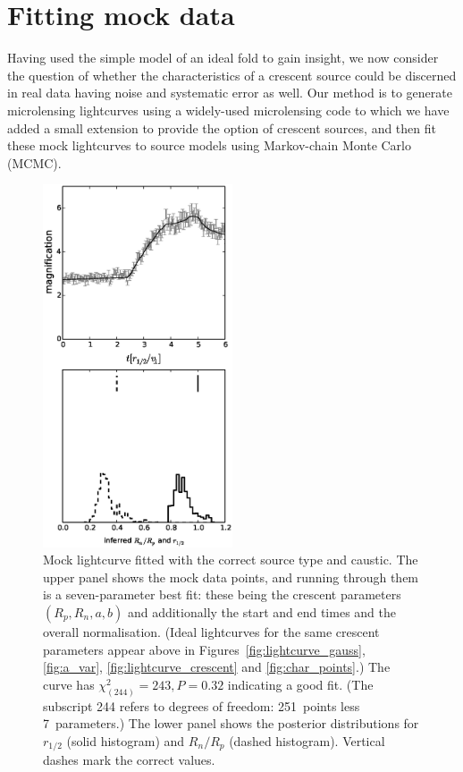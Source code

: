 \documentclass[usenatbib]{mn2e}
\begin{document}
\section{Fitting mock data}\label{sec:numerics}

Having used the simple model of an ideal fold to gain insight, we now
consider the question of whether the characteristics of a crescent
source could be discerned in real data having noise and systematic
error as well.  Our method is to generate microlensing lightcurves
using a widely-used microlensing code
\citep{1990PhDT.......180W,1999A&A...346L...5W,1999JCoAM.109..353W} to
which we have added a small extension to provide the option of
crescent sources, and then fit these mock lightcurves to source models
using Markov-chain Monte Carlo (MCMC).

\begin{figure}
\centering
  \includegraphics[width=0.5\textwidth]{figures/cc_forward.eps}
\caption{\label{fig:cc_forward} Mock lightcurve fitted with the
  correct source type and caustic.  The upper panel shows the mock
  data points, and running through them is a seven-parameter best fit:
  these being the crescent parameters $(R_p,R_n,a,b)$ and additionally
  the start and end times and the overall normalisation.  (Ideal
  lightcurves for the same crescent parameters appear above in
  Figures~\ref{fig:lightcurve_gauss}, \ref{fig:a_var},
  \ref{fig:lightcurve_crescent} and \ref{fig:char_points}.)  The curve
  has $\chi^2_{(244)}=243, P=0.32$ indicating a good fit.  (The
  subscript 244 refers to degrees of freedom: 251~points less
  7~parameters.)  The lower panel shows the posterior distributions
  for $r_{1/2}$ (solid histogram) and $R_n/R_p$ (dashed histogram).
  Vertical dashes mark the correct values.}
\end{figure}
\end{document}
